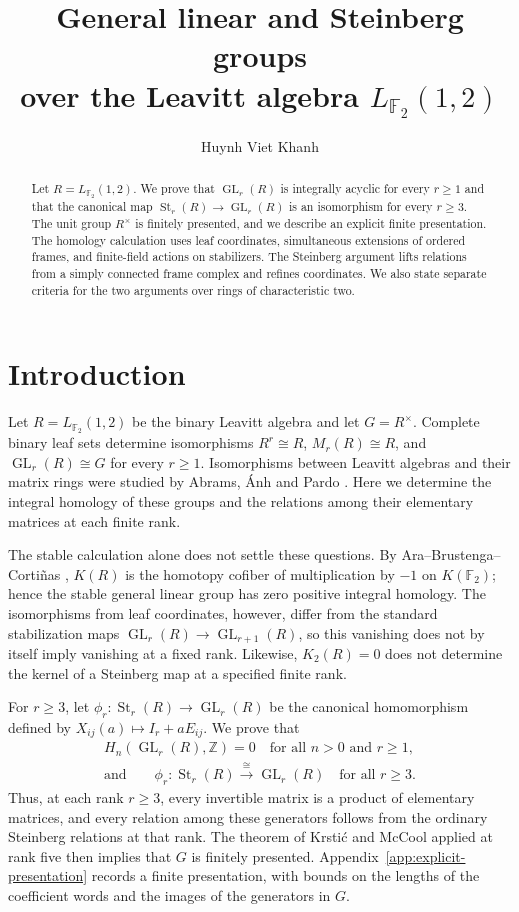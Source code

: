 \documentclass[11pt]{amsart}
\title[General linear and Steinberg groups over the Leavitt algebra $L_{\mathbb F_2}(1,2)$]{General linear and Steinberg groups\\over the Leavitt algebra $L_{\mathbb F_2}(1,2)$}
\author{Huynh Viet Khanh}
\date{}
\newcommand{\Z}{\mathbb Z}
\newcommand{\F}{\mathbb F}
\DeclareMathOperator{\GL}{GL}
\DeclareMathOperator{\St}{St}
\theoremstyle{definition}
\theoremstyle{remark}
\numberwithin{equation}{section}
\begin{document}
\begin{abstract}
Let $R=L_{\F_2}(1,2)$. We prove that $\GL_r(R)$ is integrally acyclic for every $r\geq1$ and that the canonical map $\St_r(R)\to\GL_r(R)$ is an isomorphism for every $r\geq3$. The unit group $R^\times$ is finitely presented, and we describe an explicit finite presentation. The homology calculation uses leaf coordinates, simultaneous extensions of ordered frames, and finite-field actions on stabilizers. The Steinberg argument lifts relations from a simply connected frame complex and refines coordinates. We also state separate criteria for the two arguments over rings of characteristic two.
\end{abstract}
\maketitle

\section{Introduction}

Let $R=L_{\F_2}(1,2)$ be the binary Leavitt algebra and let $G=R^\times$. Complete binary leaf sets determine isomorphisms $R^r\cong R$, $M_r(R)\cong R$, and $\GL_r(R)\cong G$ for every $r\geq1$. Isomorphisms between Leavitt algebras and their matrix rings were studied by Abrams, \'{A}nh and Pardo \cite{AAP08}. Here we determine the integral homology of these groups and the relations among their elementary matrices at each finite rank.

The stable calculation alone does not settle these questions. By Ara--Brustenga--Corti\~nas \cite[Theorem~7.6]{ABC09}, $K(R)$ is the homotopy cofiber of multiplication by $-1$ on $K(\F_2)$; hence the stable general linear group has zero positive integral homology. The isomorphisms from leaf coordinates, however, differ from the standard stabilization maps $\GL_r(R)\to\GL_{r+1}(R)$, so this vanishing does not by itself imply vanishing at a fixed rank. Likewise, $K_2(R)=0$ does not determine the kernel of a Steinberg map at a specified finite rank.

For $r\geq3$, let $\phi_r:\St_r(R)\to\GL_r(R)$ be the canonical homomorphism defined by $X_{ij}(a)\mapsto I_r+aE_{ij}$. We prove that
$$
\begin{gathered}
H_n(\GL_r(R),\Z)=0\quad\text{for all }n>0\text{ and }r\geq1,\\
\text{and}\qquad\phi_r:\St_r(R)\xrightarrow{\ \cong\ }\GL_r(R)\quad\text{for all }r\geq3.
\end{gathered}
$$
Thus, at each rank $r\geq3$, every invertible matrix is a product of elementary matrices, and every relation among these generators follows from the ordinary Steinberg relations at that rank. The theorem of Krsti\'c and McCool applied at rank five then implies that $G$ is finitely presented. Appendix~\ref{app:explicit-presentation} records a finite presentation, with bounds on the lengths of the coefficient words and the images of the generators in $G$.
\end{document}
